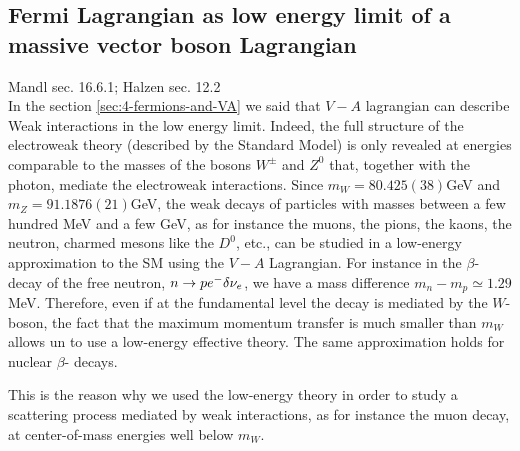 \documentclass[TheoreticalPhy_ModB.tex]{subfiles}
\begin{document}
\subsection{Fermi Lagrangian as low energy limit of a massive vector boson Lagrangian}
\textsf{Mandl sec. 16.6.1; Halzen sec. 12.2}\\

In the section \ref{sec:4-fermions-and-VA} we said that $V-A$ lagrangian can describe Weak interactions in the low energy limit. Indeed, the full structure of the electroweak theory (described by the Standard Model) is only revealed at energies comparable to the masses of the bosons $W^\pm$ and $Z^0$ that, together with the photon, mediate the electroweak interactions. Since $m_W=80.425(38)$GeV and $m_Z=91.1876(21)$GeV, the weak decays of particles with masses between a few hundred MeV and a few GeV, as for instance the muons, the pions, the kaons, the neutron, charmed mesons like the $D^0$, etc., can be studied in a low-energy approximation to the SM using the $V-A$ Lagrangian. For instance in the $\beta$-decay of the free neutron, $n\to pe^-\var\nu_e$, we have a mass difference $m_n-m_p\simeq1.29$ MeV. Therefore, even if at the fundamental level the decay is mediated by the $W$-boson, the fact that the maximum momentum transfer is much smaller than $m_W$ allows un to use a low-energy effective theory. The same approximation holds for nuclear $\beta$- decays. 

This is the reason why we used the low-energy theory in order to study a scattering process mediated by weak interactions, as for instance the muon decay, at center-of-mass energies well below $m_W$.
\end{document}
